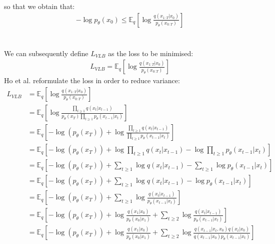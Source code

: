 \documentclass{article}
\begin{document}
so that we obtain that:
\begin{align}
  - \log p_{\theta}\left(x_0\right) \leq \mathbb{E}_q \left[\log \frac{q\left(x_{1:T}|x_0\right)}{p_{\theta}\left(x_{0:T}\right)}\right]
\end{align}
\\\\
We can subsequently define $L_{VLB}$ as the loss to be minimised:
\begin{gather}
  L_{VLB} = \mathbb{E}_q \left[\log \frac{q\left(x_{1:T}|x_0\right)}{p_{\theta}\left(x_{0:T}\right)}\right] 
\end{gather}
Ho et al. \cite{ho2020denoising} reformulate the loss in order to reduce variance:
\begin{align}
  L_{VLB} &= \mathbb{E}_q \left[\log \frac{q\left(x_{1:T}|x_0\right)}{p_{\theta}\left(x_{0:T}\right)}\right] \\
  &= \mathbb{E}_q \left[\log \frac{\prod_{t \geq 1} q\left(x_t | x_{t-1}\right)}{p_{\theta} \left(x_T\right) \prod_{t \geq 1} p_{\theta}\left(x_{t-1} | x_t\right)}\right] \\
  &= \mathbb{E}_q \left[-\log\left(p_{\theta}\left(x_T\right)\right) + \log \frac{\prod_{t \geq 1} q\left(x_t | x_{t-1}\right)}{\prod_{t \geq 1} p_{\theta}\left(x_{t-1} | x_t\right)}\right] \\
  &= \mathbb{E}_q \left[-\log\left(p_{\theta}\left(x_T\right)\right) + \log \prod_{t \geq 1} q\left(x_t | x_{t-1}\right) - \log \prod_{t \geq 1} p_{\theta}\left(x_{t-1} | x_t\right)\right] \\
  &= \mathbb{E}_q \left[-\log\left(p_{\theta}\left(x_T\right)\right) + \sum_{t \geq 1} \log q\left(x_t | x_{t-1}\right) - \sum_{t \geq 1} \log p_{\theta}\left(x_{t-1} | x_t\right)\right] \\
  &= \mathbb{E}_q \left[-\log\left(p_{\theta}\left(x_T\right)\right) + \sum_{t \geq 1} \log q\left(x_t | x_{t-1}\right) - \log p_{\theta}\left(x_{t-1} | x_t\right)\right] \\
  &= \mathbb{E}_q \left[-\log\left(p_{\theta}\left(x_T\right)\right) + \sum_{t \geq 1} \log \frac{q\left(x_t | x_{t-1}\right)}{p_{\theta}\left(x_{t-1} | x_t\right)}\right] \\
  &= \mathbb{E}_q \left[-\log\left(p_{\theta}\left(x_T\right)\right) + \log \frac{q\left(x_1 | x_0\right)}{p_{\theta}\left(x_0 | x_1\right)} + \sum_{t \geq 2} \log \frac{q\left(x_t | x_{t-1}\right)}{p_{\theta}\left(x_{t-1} | x_t\right)}\right] \\
  &= \mathbb{E}_q \left[-\log\left(p_{\theta}\left(x_T\right)\right) + \log \frac{q\left(x_1 | x_0\right)}{p_{\theta}\left(x_0 | x_1\right)} + \sum_{t \geq 2} \log \frac{q\left(x_{t-1} | x_t, x_0\right) q\left(x_t | x_0\right)}{{q\left(x_{t-1} | x_0\right)} p_{\theta}\left(x_{t-1} | x_t\right)}\right] \\

\end{align}
\end{document}
